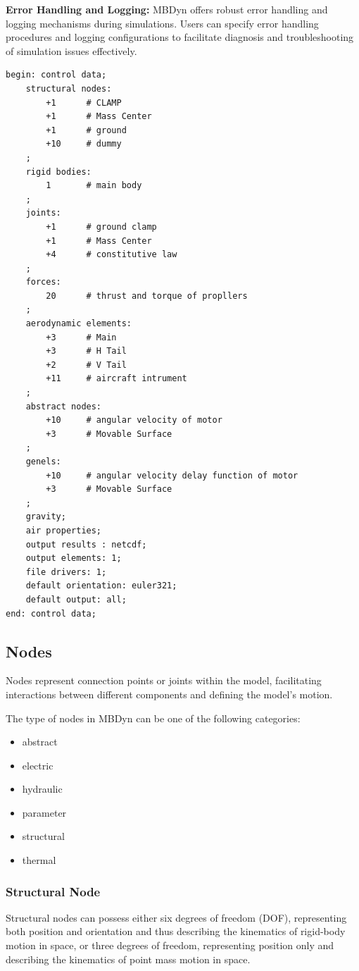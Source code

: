 \textbf{Error Handling and Logging:} MBDyn offers robust error handling and logging mechanisms during simulations. Users can specify error handling procedures and logging configurations to facilitate diagnosis and troubleshooting of simulation issues effectively.
\begin{verbatim}
begin: control data;
    structural nodes:
        +1      # CLAMP
        +1      # Mass Center
        +1      # ground
        +10     # dummy
    ;
    rigid bodies:
        1       # main body
    ;
    joints:
        +1      # ground clamp
        +1      # Mass Center
        +4      # constitutive law
    ;
    forces:
        20      # thrust and torque of propllers
    ;
    aerodynamic elements:
        +3      # Main
        +3      # H Tail
        +2      # V Tail
        +11     # aircraft intrument
    ;
    abstract nodes:
        +10     # angular velocity of motor
        +3      # Movable Surface
    ;
    genels:
        +10     # angular velocity delay function of motor
        +3      # Movable Surface
    ;
    gravity;
    air properties;
    output results : netcdf;
    output elements: 1;
    file drivers: 1;
    default orientation: euler321;
    default output: all;
end: control data;
\end{verbatim}

\subsection{Nodes} 
Nodes represent connection points or joints within the model, facilitating interactions between different components and defining the model's motion.

The type of nodes in MBDyn can be one of the following categories:
\begin{itemize}
    \item abstract
    \item electric
    \item hydraulic
    \item parameter
    \item structural
    \item thermal
\end{itemize}

\subsubsection{Structural Node}
Structural nodes can possess either six degrees of freedom (DOF), representing both position and orientation and thus describing the kinematics of rigid-body motion in space, or three degrees of freedom, representing position only and describing the kinematics of point mass motion in space.

